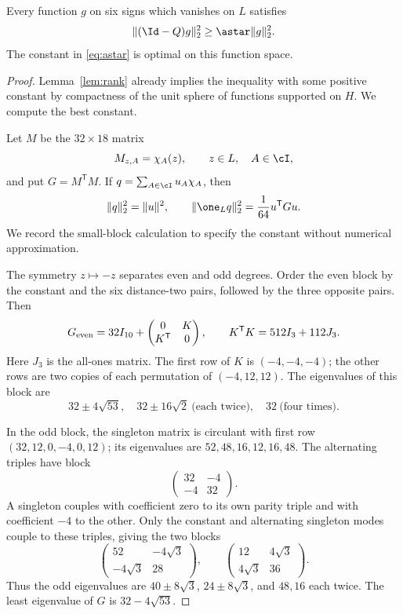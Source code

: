 \begin{proposition}\label{prop:coercivity}
Every function $g$ on six signs which vanishes on $L$ satisfies
\begin{equation}\label{eq:coercivity}
 \|(\Id-Q)g\|_2^2\ge\astar\|g\|_2^2.
\end{equation}
The constant in \eqref{eq:astar} is optimal on this function space.
\end{proposition}
\begin{proof}
Lemma~\ref{lem:rank} already implies the inequality with some positive constant by compactness of the unit sphere of functions supported on $H$. We compute the best constant.

Let $M$ be the $32\times18$ matrix
\[
 M_{z,A}=\chi_A(z),\qquad z\in L,\quad A\in\cI,
\]
and put $G=M^{\mathsf T}M$. If $q=\sum_{A\in\cI}u_A\chi_A$, then
\begin{equation}\label{eq:gramnorm}
 \|q\|_2^2=\|u\|^2,\qquad
 \|\one_Lq\|_2^2=\frac1{64}u^{\mathsf T}Gu.
\end{equation}
We record the small-block calculation to specify the constant without numerical approximation.

The symmetry $z\mapsto-z$ separates even and odd degrees. Order the even block by the constant and the six distance-two pairs, followed by the three opposite pairs. Then
\[
 G_{\rm even}=32I_{10}+
 \begin{pmatrix}0&K\\K^{\mathsf T}&0\end{pmatrix},
 \qquad K^{\mathsf T}K=512I_3+112J_3.
\]
Here $J_3$ is the all-ones matrix. The first row of $K$ is $(-4,-4,-4)$; the other rows are two copies of each permutation of $(-4,12,12)$. The eigenvalues of this block are
\[
 32\pm4\sqrt{53},\quad
 32\pm16\sqrt2\ \text{(each twice)},\quad
 32\ \text{(four times)}.
\]

In the odd block, the singleton matrix is circulant with first row $(32,12,0,-4,0,12)$; its eigenvalues are $52,48,16,12,16,48$. The alternating triples have block
\[
 \begin{pmatrix}32&-4\\-4&32\end{pmatrix}.
\]
A singleton couples with coefficient zero to its own parity triple and with coefficient $-4$ to the other. Only the constant and alternating singleton modes couple to these triples, giving the two blocks
\[
 \begin{pmatrix}52&-4\sqrt3\\-4\sqrt3&28\end{pmatrix},
 \qquad
 \begin{pmatrix}12&4\sqrt3\\4\sqrt3&36\end{pmatrix}.
\]
Thus the odd eigenvalues are $40\pm8\sqrt3$, $24\pm8\sqrt3$, and $48,16$ each twice. The least eigenvalue of $G$ is $32-4\sqrt{53}$.


\end{proof}
